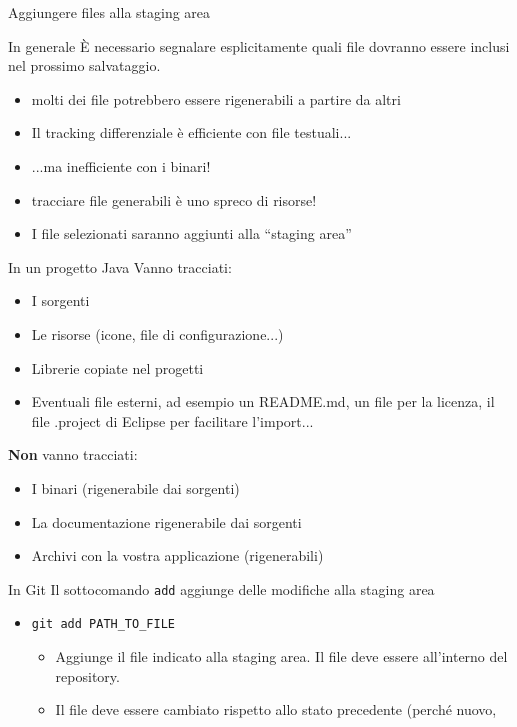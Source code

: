 \documentclass[xcolor=dvipsnames,presentation]{beamer}
\begin{document}
\begin{frame}{Aggiungere files alla staging area}
	\begin{block}{In generale}
		È necessario segnalare esplicitamente quali file dovranno essere inclusi nel prossimo
salvataggio.
		\begin{itemize}
			\item molti dei file potrebbero essere rigenerabili a partire da altri
			\item Il tracking differenziale è efficiente con file testuali...
			\item ...ma inefficiente con i binari!
			\item tracciare file generabili è uno spreco di risorse!
			\item I file selezionati saranno aggiunti alla ``staging area''
		\end{itemize}
	\end{block}
	\begin{block}{In un progetto Java}
		Vanno tracciati:
		\begin{itemize}
			\item I sorgenti
			\item Le risorse (icone, file di configurazione...)
			\item Librerie copiate nel progetti
			\item Eventuali file esterni, ad esempio un README.md, un file per la licenza, il file .project di Eclipse per facilitare l'import...
		\end{itemize}
		\textbf{Non} vanno tracciati:
		\begin{itemize}
			\item I binari (rigenerabile dai sorgenti)
			\item La documentazione rigenerabile dai sorgenti
			\item Archivi con la vostra applicazione (rigenerabili)
		\end{itemize}
	\end{block}
	\begin{block}{In Git}
		Il sottocomando \texttt{add} aggiunge delle modifiche alla staging area
		\begin{itemize}
			\item \texttt{git add PATH\_TO\_FILE}
			\begin{itemize}
				\item Aggiunge il file indicato alla staging area. Il file deve essere all'interno
del repository.
				\item Il file deve essere cambiato rispetto allo stato precedente (perché nuovo,

\end{itemize}
\end{itemize}
\end{block}
\end{frame}
\end{document}
